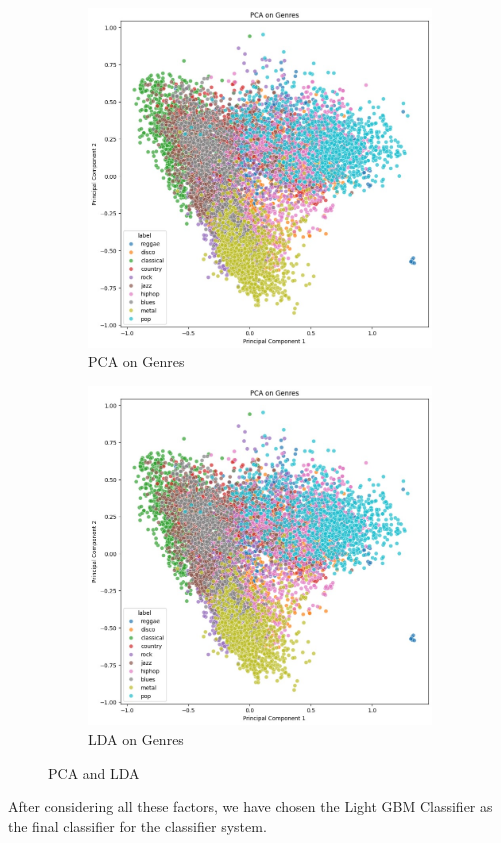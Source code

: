 \documentclass[a4paper, 24pt]{article}
\begin{document}
\begin{figure}[H]
    \centering
    \begin{subfigure}{0.45\textwidth}
        \centering
        \includegraphics[width=0.5\linewidth]{WhatsApp Image 2024-04-21 at 02.53.22_eae1224c.jpg}
        \caption{PCA on Genres}
        \label{fig:pca_class}
    \end{subfigure}
    \hfill
    \begin{subfigure}{0.45\textwidth}
        \centering
        \includegraphics[width=0.5\linewidth]{WhatsApp Image 2024-04-21 at 02.53.22_eae1224cshik.jpg}
        \caption{LDA on Genres}
        \label{fig:lda_class}
    \end{subfigure}
    \caption{PCA and LDA}
    \label{fig:combined_plots0}
\end{figure}
After considering all these factors, we have chosen the Light GBM Classifier as the final classifier for the classifier system.
\end{document}
